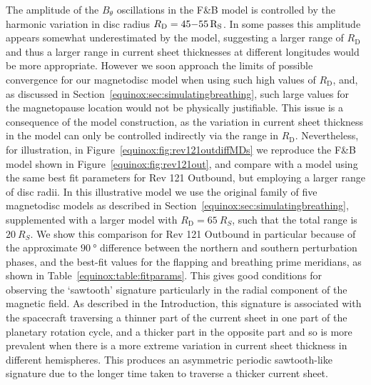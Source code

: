 The amplitude of the $B_{\theta}$ oscillations in the F{\&}B model is controlled by the harmonic variation in disc radius $R_\mathrm{D}=45{\--}\SI{55}{R_S}$. In some passes this amplitude appears somewhat underestimated by the model, suggesting a larger range of $R_\mathrm{D}$ and thus a larger range in current sheet thicknesses at different longitudes would be more appropriate. However we soon approach the limits of possible convergence for our magnetodisc model when using such high values of $R_\mathrm{D}$, and, as discussed in Section~\ref{equinox:sec:simulatingbreathing}, such large values for the magnetopause location would not be physically justifiable. This issue is a consequence of the model construction, as the variation in current sheet thickness in the model can only be controlled indirectly via the range in $R_\mathrm{D}$. Nevertheless, for illustration, in Figure~\ref{equinox:fig:rev121outdiffMDs} we reproduce the F{\&}B model shown in Figure~\ref{equinox:fig:rev121out}, and compare with a model using the same best fit parameters for Rev 121 Outbound, but employing a larger range of disc radii. In this illustrative model we use the original family of five magnetodisc models as described in Section~\ref{equinox:sec:simulatingbreathing}, supplemented with a larger model with $R_\mathrm{D}=\SI{65}{R_S}$, such that the total range is $\SI{20}{R_S}$. We show this comparison for Rev 121 Outbound in particular because of the approximate $\SI{90}{\degree}$ difference between the northern and southern perturbation phases, and the best-fit values for the flapping and breathing prime meridians, as shown in Table~\ref{equinox:table:fitparams}. This gives good conditions for observing the `sawtooth' signature particularly in the radial component of the magnetic field. As described in the Introduction, this signature is associated with the spacecraft traversing a thinner part of the current sheet in one part of the planetary rotation cycle, and a thicker part in the opposite part \citep{cowley2017a} and so is more prevalent when there is a more extreme variation in current sheet thickness in different hemispheres. This produces an asymmetric periodic sawtooth-like signature due to the longer time taken to traverse a thicker current sheet. 

